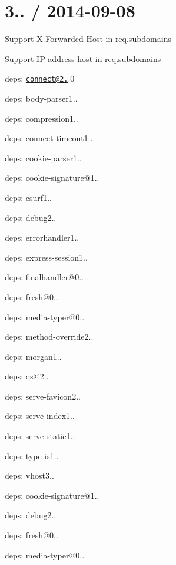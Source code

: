{\ttfamily \section*{3.. / 2014-\/09-\/08 }}

{\ttfamily }

{\ttfamily 
\begin{DoxyItemize}
\item Support {\ttfamily X-\/\+Forwarded-\/\+Host} in {\ttfamily req.\+subdomains}
\item Support IP address host in {\ttfamily req.\+subdomains}
\item deps\+: \href{mailto:connect@2.26}{\tt connect@2.}.0
\begin{DoxyItemize}
\item deps\+: body-\/parser1..
\item deps\+: compression1..
\item deps\+: connect-\/timeout1..
\item deps\+: cookie-\/parser1..
\item deps\+: cookie-\/signature@1..
\item deps\+: csurf1..
\item deps\+: debug2..
\item deps\+: errorhandler1..
\item deps\+: express-\/session1..
\item deps\+: finalhandler@0..
\item deps\+: fresh@0..
\item deps\+: media-\/typer@0..
\item deps\+: method-\/override2..
\item deps\+: morgan1..
\item deps\+: qs@2..
\item deps\+: serve-\/favicon2..
\item deps\+: serve-\/index1..
\item deps\+: serve-\/static1..
\item deps\+: type-\/is1..
\item deps\+: vhost3..
\end{DoxyItemize}
\item deps\+: cookie-\/signature@1..
\item deps\+: debug2..
\item deps\+: fresh@0..
\item deps\+: media-\/typer@0..

\end{DoxyItemize}}
